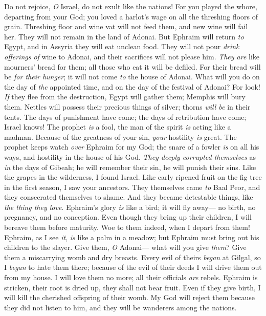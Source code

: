 \begin{biblechapter} %
 Do not rejoice, \textit{O} Israel, 
do not exult like the nations! 
For you played the whore, departing from your God; 
you loved a harlot’s wage 
on all the threshing floors of grain.
\verse Threshing floor and wine vat will not feed them, 
and new wine will fail her.
\verse They will not remain 
in the land of Adonai. 
But Ephraim will return \textit{to} Egypt, 
and in Assyria they will eat unclean food.
\verse They will not pour \textit{drink offerings of} wine to Adonai, 
and their sacrifices will not please him. 
\textit{They are} like mourners’ bread for them; 
all those who eat it will be defiled. 
For their bread will be \textit{for their hunger}; 
it will not come \textit{to} the house of Adonai.
\verse What will you do on the day of \textit{the} appointed time, 
and on the day of the festival of Adonai?
\verse For look! \textit{If} they flee from the destruction, 
Egypt will gather them; 
Memphis will bury them. 
Nettles will possess 
their precious things of silver; 
thorns \textit{will be} in their tents.
\verse The days of punishment have come; 
the days of retribution have come; 
Israel knows! 
The prophet \textit{is} a fool, 
the man of the spirit \textit{is} acting like a madman. 
Because of the greatness of your sin, 
\textit{your} hostility \textit{is} great.
\verse The prophet keeps watch \textit{over} Ephraim for my God; 
the snare of a fowler \textit{is} on all his ways, 
and hostility in the house of his God.
\verse \textit{They deeply corrupted themselves} 
as \textit{in} the days of Gibeah; 
he will remember their sin, 
he will punish their sins.
\verse Like the grapes in the wilderness, 
I found Israel. 
Like early ripened fruit on the fig tree in the first season, 
I saw your ancestors. 
They themselves came \textit{to} Baal Peor, 
and they consecrated themselves to shame. 
And they became detestable things, 
like \textit{the thing they love}.
\verse Ephraim’s glory \textit{is} like a bird; 
it will fly away— 
no birth, no pregnancy, and no conception.
\verse Even though they bring up their children, 
I will bereave them before maturity. 
Woe to them indeed, 
when I depart from them!
\verse Ephraim, as I see \textit{it}, 
\textit{is} like a palm in a meadow; 
but Ephraim must bring out 
his children to the slayer.
\verse Give them, \textit{O} Adonai— 
what will you give \textit{them}? 
Give them a miscarrying womb 
and dry breasts.
\verse Every evil of theirs \textit{began} at Gilgal, 
so I \textit{began} to hate them there; 
because of the evil of their deeds 
I will drive them out from my house. 
I will love them no more; 
all their officials \textit{are} rebels.
\verse Ephraim is stricken, 
their root is dried up, 
they shall not bear fruit. 
Even if they give birth, 
I will kill the cherished offspring of their womb.
\verse My God will reject them 
because they did not listen to him, 
and they will be wanderers among the nations.
\end{biblechapter}

